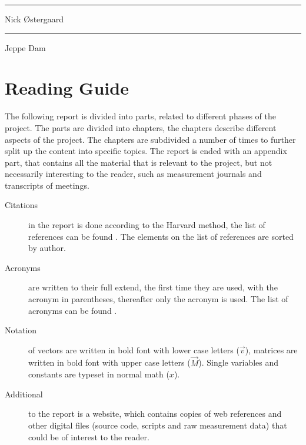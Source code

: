 \begin{center}
  \begin{minipage}[t]{0.47\textwidth}
    \centering \vspace{1.5cm} \hrule \vspace{1mm} Nick \O stergaard
  \end{minipage}
  \hfill
  \begin{minipage}[t]{0.47\textwidth}
    \centering \vspace{1.5cm} \hrule \vspace{1mm} Jeppe Dam
  \end{minipage}
\end{center}


\newpage
\section*{Reading Guide}
The following report is divided into parts, related to different phases of the project. The parts are divided into chapters, the chapters describe different aspects of the project. The chapters are subdivided a number of times to further split up the content into specific topics. The report is ended with an appendix part, that contains all the material that is relevant to the project, but not necessarily interesting to the reader, such as measurement journals and transcripts of meetings.

\begin{description}
\item[Citations] in the report is done according to the Harvard method, the list of references can be found . The elements on the list of references are sorted by author.
\item[Acronyms] are written to their full extend, the first time they are used, with the acronym in parentheses, thereafter only the acronym is used. The list of acronyms can be found .
\item[Notation] of vectors are written in bold font with lower case letters ($\vec{v}$), matrices are written in bold font with upper case letters ($\vec{M}$). Single variables and constants are typeset in normal math ($x$).
\item[Additional] to the report is a website, which contains copies of web references and other digital files (source code, scripts and raw measurement data) that could be of interest to the reader.
\end{description}
